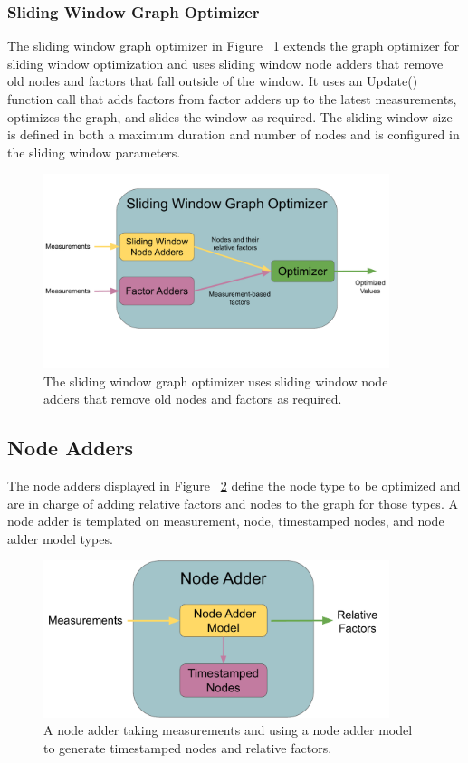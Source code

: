 \subsubsection{Sliding Window Graph Optimizer}
The sliding window graph optimizer in Figure ~\ref{img:sliding_window_graph_opt} extends the graph optimizer for sliding window optimization and uses sliding window node adders that remove old nodes and factors that fall outside of the window. 
It uses an Update() function call that adds factors from factor adders up to the latest measurements, optimizes the graph, and slides the window as required.
The sliding window size is defined in both a maximum duration and number of nodes and is configured in the sliding window parameters.
\begin{figure}[ht]
    \centering
\includegraphics[width=0.9\textwidth]{sliding_window_graph_opt.pdf}
 \caption{The sliding window graph optimizer uses sliding window node adders that remove old nodes and factors as required.}
  \label{img:sliding_window_graph_opt}
\end{figure}
\subsection{Node Adders}
The node adders displayed in Figure ~\ref{img:node_adder} define the node type to be optimized and are in charge of adding relative factors and nodes to the graph for those types.
A node adder is templated on measurement, node, timestamped nodes, and node adder model types.
\begin{figure}[H]
    \centering
\includegraphics[width=0.9\textwidth]{node_adder.pdf}
 \caption{A node adder taking measurements and using a node adder model to generate timestamped nodes and relative factors.}
  \label{img:node_adder}
\end{figure}

